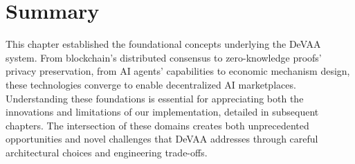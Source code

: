\section{Summary}

This chapter established the foundational concepts underlying the DeVAA system. From blockchain's distributed consensus to zero-knowledge proofs' privacy preservation, from AI agents' capabilities to economic mechanism design, these technologies converge to enable decentralized AI marketplaces. Understanding these foundations is essential for appreciating both the innovations and limitations of our implementation, detailed in subsequent chapters. The intersection of these domains creates both unprecedented opportunities and novel challenges that DeVAA addresses through careful architectural choices and engineering trade-offs.
